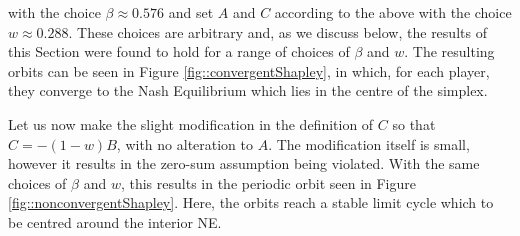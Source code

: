 \documentclass{article}
\theoremstyle{definition}
\begin{document}
  with the choice $\beta \approx 0.576$ and set $A$ and $C$ according to the above with the choice $w \approx 0.288$. These choices are arbitrary and, as we discuss below, the results of this Section were found to hold for a range of choices of $\beta$ and $w$. The resulting orbits can be seen in Figure \ref{fig::convergentShapley}, in which, for each player, they converge to the Nash Equilibrium which lies in the centre of the simplex.

  Let us now make the slight modification in the definition of $C$ so that
    $C  = - (1 - w) B$, 
  with no alteration to $A$. The modification itself is small, however it results in the zero-sum
  assumption being violated. With the same choices of $\beta$ and $w$, this results in the periodic
  orbit seen in Figure \ref{fig::nonconvergentShapley}. Here,
  the orbits reach a stable limit cycle which to be centred around the interior NE.
\end{document}
